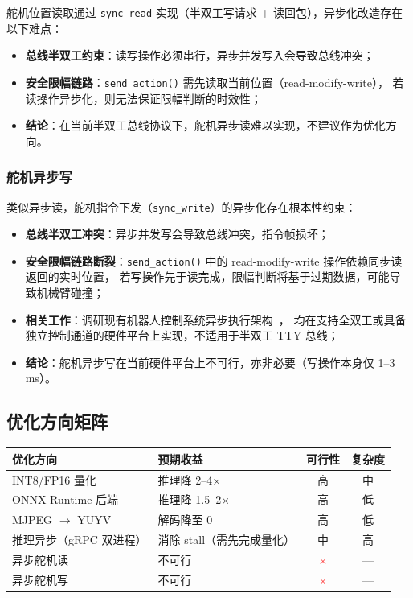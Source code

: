 舵机位置读取通过 \texttt{sync\_read} 实现（半双工写请求 + 读回包），异步化改造存在以下难点：
\begin{itemize}[leftmargin=2em]
  \item \textbf{总线半双工约束}：读写操作必须串行，异步并发写入会导致总线冲突；
  \item \textbf{安全限幅链路}：\texttt{send\_action()} 需先读取当前位置（read-modify-write），
        若读操作异步化，则无法保证限幅判断的时效性；
  \item \textbf{结论}：在当前半双工总线协议下，舵机异步读难以实现，不建议作为优化方向。
\end{itemize}

\subsubsection{舵机异步写}

类似异步读，舵机指令下发（\texttt{sync\_write}）的异步化存在根本性约束：
\begin{itemize}[leftmargin=2em]
  \item \textbf{总线半双工冲突}：异步并发写会导致总线冲突，指令帧损坏；
  \item \textbf{安全限幅链路断裂}：\texttt{send\_action()} 中的 read-modify-write 操作依赖同步读返回的实时位置，
        若写操作先于读完成，限幅判断将基于过期数据，可能导致机械臂碰撞；
  \item \textbf{相关工作}：调研现有机器人控制系统异步执行架构~\cite{async_robot}，
        均在支持全双工或具备独立控制通道的硬件平台上实现，不适用于半双工 TTY 总线；
  \item \textbf{结论}：舵机异步写在当前硬件平台上不可行，亦非必要（写操作本身仅 1--3 ms）。
\end{itemize}

\subsection{优化方向矩阵}

\begin{center}
\begin{tabular}{p{3.5cm}p{2.8cm}cc}
  \toprule
  优化方向 & 预期收益 & 可行性 & 复杂度 \\
  \midrule
  INT8/FP16 量化          & 推理降 2--4$\times$ & 高 & 中 \\
  ONNX Runtime 后端       & 推理降 1.5--2$\times$ & 高 & 低 \\
  MJPEG $\to$ YUYV        & 解码降至 0 & 高 & 低 \\
  推理异步（gRPC 双进程）  & 消除 stall（需先完成量化） & 中 & 高 \\
  异步舵机读              & 不可行 & \textcolor{red}{×} & — \\
  异步舵机写              & 不可行 & \textcolor{red}{×} & — \\
  \bottomrule
\end{tabular}
\end{center}

